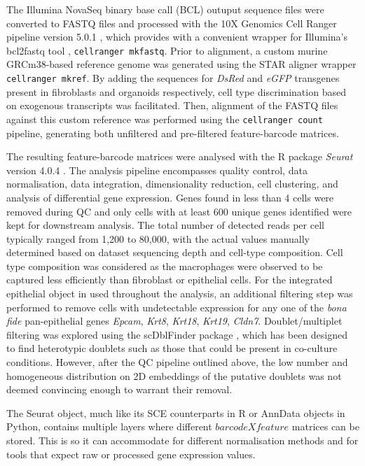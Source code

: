 The Illumina NovaSeq binary base call (BCL) outuput sequence files were converted to FASTQ files and processed with the 10X Genomics Cell Ranger pipeline version 5.0.1 \cite{10x_genomics_what_nodate}, which provides with a convenient wrapper for Illumina's bcl2fastq tool \cite{illumina_bcl2fastq_nodate}, \texttt{cellranger mkfastq}. Prior to alignment, a custom murine GRCm38-based reference genome was generated using the STAR aligner \cite{dobin_star_2013} wrapper \texttt{cellranger mkref}. By adding the sequences for \textit{DsRed} and \textit{eGFP} transgenes present in fibroblasts and organoids respectively, cell type discrimination based on exogenous transcripts was facilitated. Then, alignment of the FASTQ files against this custom reference was performed using the \texttt{cellranger count} pipeline, generating both unfiltered and pre-filtered feature-barcode matrices.

The resulting feature-barcode matrices were analysed with the R package \textit{Seurat} version 4.0.4 \cite{hao_integrated_2021}. 
The analysis pipeline encompasses quality control, data normalisation, data integration, dimensionality reduction, cell clustering, and analysis of differential gene expression. 
Genes found in less than 4 cells were removed during QC and only cells with at least 600 unique genes identified were kept for downstream analysis. The total number of detected reads per cell typically ranged from 1,200 to 80,000, with the actual values manually determined based on dataset sequencing depth and cell-type composition. 
Cell type composition was considered as the macrophages were observed to be captured less efficiently than fibroblast or epithelial cells.
For the integrated epithelial object in used throughout the analysis, an additional filtering step was performed to remove cells with undetectable expression for any one of the \emph{bona fide} pan-epithelial genes \textit{Epcam}, \textit{Krt8}, \textit{Krt18}, \textit{Krt19}, \textit{Cldn7}. 
Doublet/multiplet filtering was explored using the scDblFinder package \cite{germain_doublet_2022}, which has been designed to find heterotypic doublets such as those that could be present in co-culture conditions. However, after the QC pipeline outlined above, the low number and homogeneous distribution on 2D embeddings of the putative doublets was not deemed convincing enough to warrant their removal.

The Seurat object, much like its SCE counterparts in R or AnnData objects in Python, contains multiple layers where different \(barcode X feature\) matrices can be stored. This is so it can accommodate for different normalisation methods and for tools that expect raw or processed gene expression values. 

